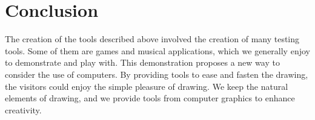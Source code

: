 \documentclass{article}
\begin{document}
\section{Conclusion}
The creation of the tools described above involved the creation of many testing tools. Some of them are games and musical applications, which we generally enjoy to demonstrate and play with. 
This demonstration proposes a new way to consider the use of computers. By providing tools to ease and fasten the drawing, the visitors could enjoy the simple pleasure of drawing. We keep the natural elements of drawing, and we provide tools from computer graphics to enhance creativity.



\end{document}
